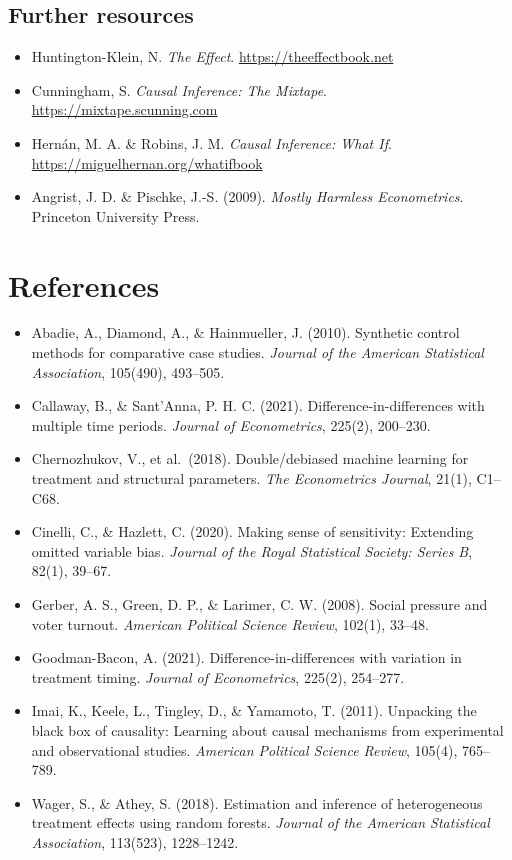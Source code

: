 \documentclass[11pt,a4paper]{article}
\begin{document}
\subsection{Further resources}
\begin{itemize}
  \item Huntington-Klein, N. \emph{The Effect}. \url{https://theeffectbook.net}
  \item Cunningham, S. \emph{Causal Inference: The Mixtape}. \url{https://mixtape.scunning.com}
  \item Hern\'an, M. A. \& Robins, J. M. \emph{Causal Inference: What If}. \url{https://miguelhernan.org/whatifbook}
  \item Angrist, J. D. \& Pischke, J.-S. (2009). \emph{Mostly Harmless Econometrics}. Princeton University Press.
\end{itemize}

\section{References}
{\small
\begin{itemize}[label={}, leftmargin=1.5em, itemindent=-1.5em]
  \item Abadie, A., Diamond, A., \& Hainmueller, J. (2010). Synthetic control methods for comparative case studies. \emph{Journal of the American Statistical Association}, 105(490), 493--505.
  \item Callaway, B., \& Sant'Anna, P. H. C. (2021). Difference-in-differences with multiple time periods. \emph{Journal of Econometrics}, 225(2), 200--230.
  \item Chernozhukov, V., et al.\ (2018). Double/debiased machine learning for treatment and structural parameters. \emph{The Econometrics Journal}, 21(1), C1--C68.
  \item Cinelli, C., \& Hazlett, C. (2020). Making sense of sensitivity: Extending omitted variable bias. \emph{Journal of the Royal Statistical Society: Series B}, 82(1), 39--67.
  \item Gerber, A. S., Green, D. P., \& Larimer, C. W. (2008). Social pressure and voter turnout. \emph{American Political Science Review}, 102(1), 33--48.
  \item Goodman-Bacon, A. (2021). Difference-in-differences with variation in treatment timing. \emph{Journal of Econometrics}, 225(2), 254--277.
  \item Imai, K., Keele, L., Tingley, D., \& Yamamoto, T. (2011). Unpacking the black box of causality: Learning about causal mechanisms from experimental and observational studies. \emph{American Political Science Review}, 105(4), 765--789.
  \item Wager, S., \& Athey, S. (2018). Estimation and inference of heterogeneous treatment effects using random forests. \emph{Journal of the American Statistical Association}, 113(523), 1228--1242.
\end{itemize}
}
\end{document}
